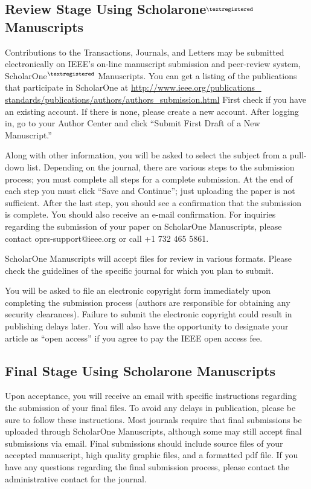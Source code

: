 \documentclass[journal]{IEEEtai}
\begin{document}
\subsection{Review Stage Using Scholarone$^{\scriptsize\textregistered}$ Manuscripts}

Contributions to the Transactions, Journals, and Letters may be submitted electronically on IEEE's on-line manuscript submission and peer-review system, ScholarOne$^{\scriptsize\textregistered}$ Manuscripts. You can get a listing of the publications that participate in ScholarOne at \underline{http://www.ieee.org/publications\_} \underline{standards/publications/authors/authors\_submission.html} First check if you have an existing account. If there is none, please create a new account. After logging in, go to your Author Center and click ``Submit First Draft of a New Manuscript.'' 



Along with other information, you will be asked to select the subject from a pull-down list. Depending on the journal, there are various steps to the submission process; you must complete all steps for a complete submission. At the end of each step you must click ``Save and Continue''; just uploading the paper is not sufficient. After the last step, you should see a confirmation that the submission is complete. You should also receive an e-mail confirmation. For inquiries regarding the submission of your paper on ScholarOne Manuscripts, please contact oprs-support@ieee.org or call +1 732 465 5861.

ScholarOne Manuscripts will accept files for review in various formats. Please check the guidelines of the specific journal for which you plan to submit. 

You will be asked to file an electronic copyright form immediately upon completing the submission process (authors are responsible for obtaining any security clearances). Failure to submit the electronic copyright could result in publishing delays later. You will also have the opportunity to designate your article as ``open access'' if you agree to pay the IEEE open access fee. 

\subsection{Final Stage Using Scholarone Manuscripts}

Upon acceptance, you will receive an email with specific instructions regarding the submission of your final files. To avoid any delays in publication, please be sure to follow these instructions. Most journals require that final submissions be uploaded through ScholarOne Manuscripts, although some may still accept final submissions via email. Final submissions should include source files of your accepted manuscript, high quality graphic files, and a formatted pdf file. If you have any questions regarding the final submission process, please contact the administrative contact for the journal. 
\end{document}
